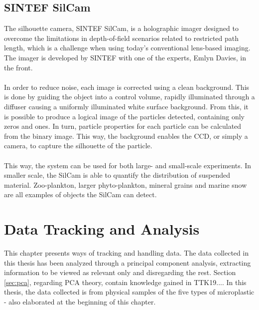 \section{SINTEF SilCam}
The silhouette camera, SINTEF SilCam, is a holographic imager designed to overcome the limitations in depth-of-field scenarios related to restricted path length, which is a challenge when using today's conventional lens-based imaging. The imager is developed by SINTEF with one of the experts, Emlyn Davies, in the front.
\\\\
In order to reduce noise, each image is corrected using a clean background. This is done by guiding the object into a control volume, rapidly illuminated through a diffuser causing a uniformly illuminated white surface background. From this, it is possible to produce a logical image of the particles detected, containing only zeros and ones. In turn, particle properties for each particle can be calculated from the binary image.
This way, the background enables the CCD, or simply a camera, to capture the silhouette of the particle.
\\\\
This way, the system can be used for both large- and small-scale experiments. In smaller scale, the SilCam is able to quantify the distribution of suspended material. Zoo-plankton, larger phyto-plankton, mineral grains and marine snow are all examples of objects the SilCam can detect. 



\chapter{Data Tracking and Analysis} \label{cap:theory3}
This chapter presents ways of tracking and handling data. The data collected in this thesis has been analyzed through a principal component analysis, extracting information to be viewed as relevant only and disregarding the rest. Section \ref{sec:pca}, regarding PCA theory, contain knowledge gained in TTK19.... In this thesis, the data collected is from physical samples of the five types of microplastic - also elaborated at the beginning of this chapter.

